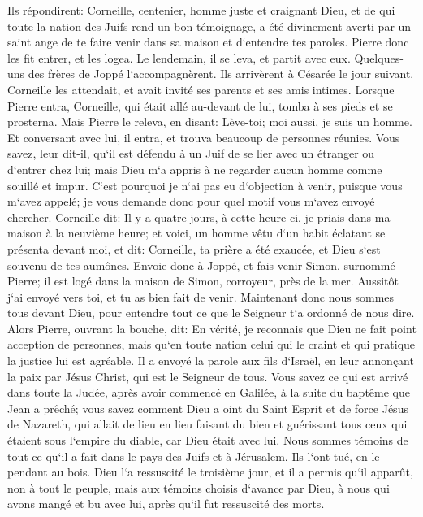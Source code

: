 \verse Ils répondirent: Corneille, centenier, homme juste et craignant Dieu, et de qui toute la nation des Juifs rend un bon témoignage, a été divinement averti par un saint ange de te faire venir dans sa maison et d`entendre tes paroles. 
\verse Pierre donc les fit entrer, et les logea. Le lendemain, il se leva, et partit avec eux. Quelques-uns des frères de Joppé l`accompagnèrent. 
\verse Ils arrivèrent à Césarée le jour suivant. Corneille les attendait, et avait invité ses parents et ses amis intimes. 
\verse Lorsque Pierre entra, Corneille, qui était allé au-devant de lui, tomba à ses pieds et se prosterna. 
\verse Mais Pierre le releva, en disant: Lève-toi; moi aussi, je suis un homme. 
\verse Et conversant avec lui, il entra, et trouva beaucoup de personnes réunies. 
\verse Vous savez, leur dit-il, qu`il est défendu à un Juif de se lier avec un étranger ou d`entrer chez lui; mais Dieu m`a appris à ne regarder aucun homme comme souillé et impur. 
\verse C`est pourquoi je n`ai pas eu d`objection à venir, puisque vous m`avez appelé; je vous demande donc pour quel motif vous m`avez envoyé chercher. 
\verse Corneille dit: Il y a quatre jours, à cette heure-ci, je priais dans ma maison à la neuvième heure; et voici, un homme vêtu d`un habit éclatant se présenta devant moi, et dit: 
\verse Corneille, ta prière a été exaucée, et Dieu s`est souvenu de tes aumônes. 
\verse Envoie donc à Joppé, et fais venir Simon, surnommé Pierre; il est logé dans la maison de Simon, corroyeur, près de la mer. 
\verse Aussitôt j`ai envoyé vers toi, et tu as bien fait de venir. Maintenant donc nous sommes tous devant Dieu, pour entendre tout ce que le Seigneur t`a ordonné de nous dire. 
\verse Alors Pierre, ouvrant la bouche, dit: En vérité, je reconnais que Dieu ne fait point acception de personnes, 
\verse mais qu`en toute nation celui qui le craint et qui pratique la justice lui est agréable. 
\verse Il a envoyé la parole aux fils d`Israël, en leur annonçant la paix par Jésus Christ, qui est le Seigneur de tous. 
\verse Vous savez ce qui est arrivé dans toute la Judée, après avoir commencé en Galilée, à la suite du baptême que Jean a prêché; 
\verse vous savez comment Dieu a oint du Saint Esprit et de force Jésus de Nazareth, qui allait de lieu en lieu faisant du bien et guérissant tous ceux qui étaient sous l`empire du diable, car Dieu était avec lui. 
\verse Nous sommes témoins de tout ce qu`il a fait dans le pays des Juifs et à Jérusalem. Ils l`ont tué, en le pendant au bois. 
\verse Dieu l`a ressuscité le troisième jour, et il a permis qu`il apparût, 
\verse non à tout le peuple, mais aux témoins choisis d`avance par Dieu, à nous qui avons mangé et bu avec lui, après qu`il fut ressuscité des morts. 
